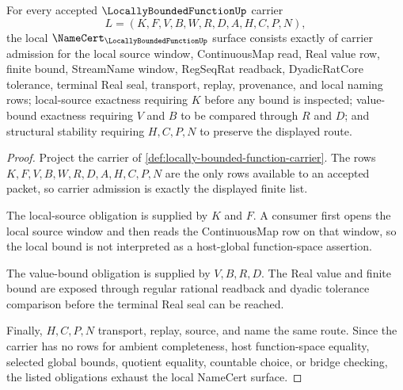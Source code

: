 \begin{theorem}
\label{thm:locally-bounded-function-namecert-obligations}
For every accepted $\LocallyBoundedFunctionUp$ carrier
$$
L=(K,F,V,B,W,R,D,A,H,C,P,N),
$$
the local $\NameCert_{\LocallyBoundedFunctionUp}$ surface consists exactly of carrier admission for the local source window, ContinuousMap read, Real value row, finite bound, StreamName window, RegSeqRat readback, DyadicRatCore tolerance, terminal Real seal, transport, replay, provenance, and local naming rows; local-source exactness requiring $K$ before any bound is inspected; value-bound exactness requiring $V$ and $B$ to be compared through $R$ and $D$; and structural stability requiring $H,C,P,N$ to preserve the displayed route.
\end{theorem}
\begin{proof}
Project the carrier of \autoref{def:locally-bounded-function-carrier}. The rows $K,F,V,B,W,R,D,A,H,C,P,N$ are the only rows available to an accepted packet, so carrier admission is exactly the displayed finite list.

The local-source obligation is supplied by $K$ and $F$. A consumer first opens the local source window and then reads the ContinuousMap row on that window, so the local bound is not interpreted as a host-global function-space assertion.

The value-bound obligation is supplied by $V,B,R,D$. The Real value and finite bound are exposed through regular rational readback and dyadic tolerance comparison before the terminal Real seal can be reached.

Finally, $H,C,P,N$ transport, replay, source, and name the same route. Since the carrier has no rows for ambient completeness, host function-space equality, selected global bounds, quotient equality, countable choice, or bridge checking, the listed obligations exhaust the local NameCert surface.
\end{proof}

